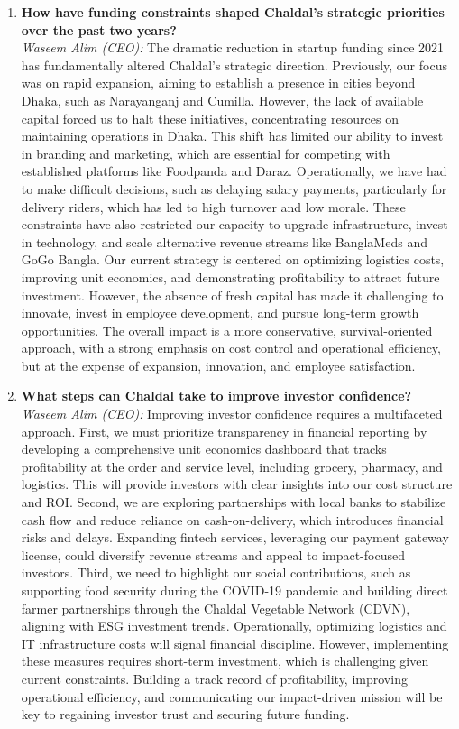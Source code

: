 \documentclass[12pt,a4paper]{article}
\begin{document}
\begin{enumerate}
        \item \textbf{How have funding constraints shaped Chaldal’s strategic priorities over the past two years?} \\
    \textit{Waseem Alim (CEO):} The dramatic reduction in startup funding since 2021 has fundamentally altered Chaldal’s strategic direction. Previously, our focus was on rapid expansion, aiming to establish a presence in cities beyond Dhaka, such as Narayanganj and Cumilla. However, the lack of available capital forced us to halt these initiatives, concentrating resources on maintaining operations in Dhaka. This shift has limited our ability to invest in branding and marketing, which are essential for competing with established platforms like Foodpanda and Daraz. Operationally, we have had to make difficult decisions, such as delaying salary payments, particularly for delivery riders, which has led to high turnover and low morale. These constraints have also restricted our capacity to upgrade infrastructure, invest in technology, and scale alternative revenue streams like BanglaMeds and GoGo Bangla. Our current strategy is centered on optimizing logistics costs, improving unit economics, and demonstrating profitability to attract future investment. However, the absence of fresh capital has made it challenging to innovate, invest in employee development, and pursue long-term growth opportunities. The overall impact is a more conservative, survival-oriented approach, with a strong emphasis on cost control and operational efficiency, but at the expense of expansion, innovation, and employee satisfaction.

    \item \textbf{What steps can Chaldal take to improve investor confidence?} \\
    \textit{Waseem Alim (CEO):} Improving investor confidence requires a multifaceted approach. First, we must prioritize transparency in financial reporting by developing a comprehensive unit economics dashboard that tracks profitability at the order and service level, including grocery, pharmacy, and logistics. This will provide investors with clear insights into our cost structure and ROI. Second, we are exploring partnerships with local banks to stabilize cash flow and reduce reliance on cash-on-delivery, which introduces financial risks and delays. Expanding fintech services, leveraging our payment gateway license, could diversify revenue streams and appeal to impact-focused investors. Third, we need to highlight our social contributions, such as supporting food security during the COVID-19 pandemic and building direct farmer partnerships through the Chaldal Vegetable Network (CDVN), aligning with ESG investment trends. Operationally, optimizing logistics and IT infrastructure costs will signal financial discipline. However, implementing these measures requires short-term investment, which is challenging given current constraints. Building a track record of profitability, improving operational efficiency, and communicating our impact-driven mission will be key to regaining investor trust and securing future funding.


\end{enumerate}
\end{document}
